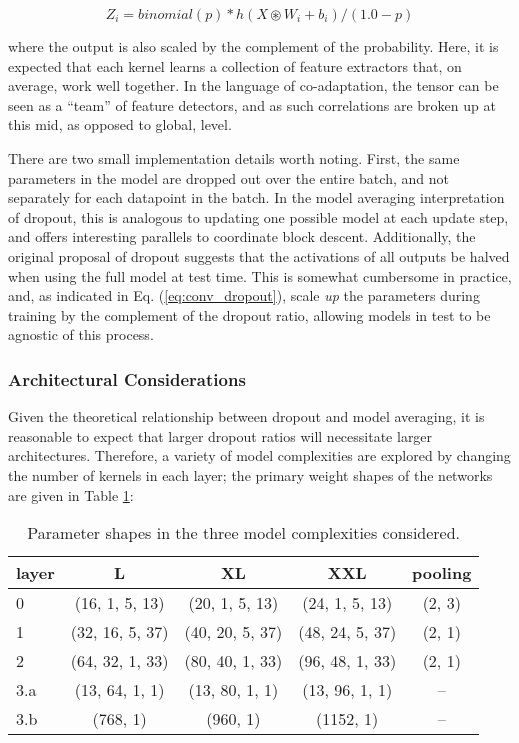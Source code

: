 \begin{equation}
\label{eq:conv_dropout}
Z_i = binomial(p) * h(X \circledast W_i + b_i) / (1.0 - p)
\end{equation}

\noindent where the output is also scaled by the complement of the probability.
Here, it is expected that each kernel learns a collection of feature extractors that, on average, work well together.
In the language of co-adaptation, the tensor can be seen as a ``team'' of feature detectors, and as such correlations are broken up at this mid, as opposed to global, level.

There are two small implementation details worth noting.
First, the same parameters in the model are dropped out over the entire batch, and not separately for each datapoint in the batch.
In the model averaging interpretation of dropout, this is analogous to updating one possible model at each update step, and offers interesting parallels to coordinate block descent.
Additionally, the original proposal of dropout suggests that the activations of all outputs be halved when using the full model at test time.
This is somewhat cumbersome in practice, and, as indicated in Eq. (\ref{eq:conv_dropout}), scale \emph{up} the parameters during training by the complement of the dropout ratio, allowing models in test to be agnostic of this process.


\subsubsection{Architectural Considerations}
\label{subsubsec:arch}

Given the theoretical relationship between dropout and model averaging, it is reasonable to expect that larger dropout ratios will necessitate larger architectures.
Therefore, a variety of model complexities are explored by changing the number of kernels in each layer; the primary weight shapes of the networks are given in Table \ref{tab:lvce_archs}:

\begin{table}[t]
\begin{center}
\caption{Parameter shapes in the three model complexities considered.}
\label{tab:lvce_archs}
\begin{tabular}{l | c | c | c | c }
layer & L & XL & XXL & pooling\\
\hline
0   & (16,  1, 5, 13) & (20,  1, 5, 13) & (24,  1, 5, 13) & (2, 3) \\
1   & (32, 16, 5, 37) & (40, 20, 5, 37) & (48, 24, 5, 37) & (2, 1) \\
2   & (64, 32, 1, 33) & (80, 40, 1, 33) & (96, 48, 1, 33) & (2, 1) \\
3.a & (13, 64, 1,  1) & (13, 80, 1,  1) & (13, 96, 1,  1) &   --   \\
3.b &    (768, 1)     &     (960, 1)    &    (1152, 1)    &   --   \\
\hline
\end{tabular}
\end{center}
\end{table}

